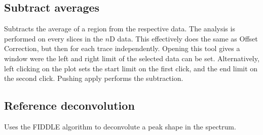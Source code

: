 \documentclass[11pt,a4paper]{article}
\begin{document}

\subsection{Subtract averages}
Subtracts the average of a region from the respective data. The analysis is performed on every slices in the $n$D data. This effectively does the same as Offset Correction, but then for each trace independently.
Opening this tool gives a window were the left and right limit of the selected data can be set. Alternatively, left clicking on the plot sets the start limit on the first click, and the end limit on the second click. Pushing apply performs the subtraction.

\subsection{Reference deconvolution}
Uses the FIDDLE algorithm to deconvolute a peak shape in the spectrum.

\end{document}
